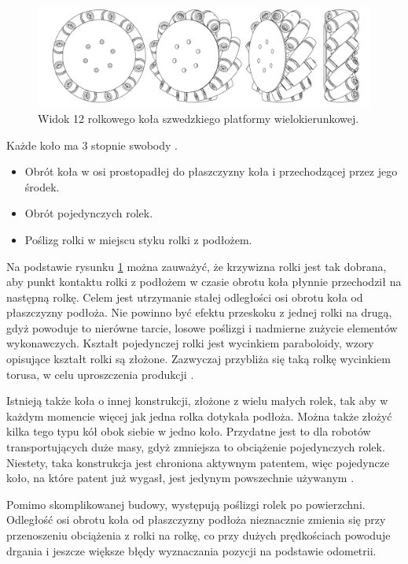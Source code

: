 	\begin{figure}[H]
	\centering
	\includegraphics[width=\textwidth]{graphics/wheel.pdf}
	\caption{Widok 12 rolkowego koła szwedzkiego platformy wielokierunkowej.}
	\label{fig:wheel}
	\end{figure} 

	Każde koło ma 3 stopnie swobody \cite{kinematic_modeling}.
	\begin{itemize}
		\item Obrót koła w osi prostopadłej do płaszczyzny koła i przechodzącej przez jego środek.
		\item Obrót pojedynczych rolek.
		\item Poślizg rolki w miejscu styku rolki z podłożem.
	\end{itemize}

	Na podstawie rysunku \ref{fig:wheel} można zauważyć, że krzywizna rolki jest tak dobrana, aby punkt kontaktu rolki z podłożem w czasie obrotu koła płynnie przechodził na następną rolkę.
	Celem jest utrzymanie stałej odległości osi obrotu koła od płaszczyzny podłoża.
	Nie powinno być efektu przeskoku z jednej rolki na drugą, gdyż powoduje to nierówne tarcie, losowe poślizgi i nadmierne zużycie elementów wykonawczych.
	Kształt pojedynczej rolki jest wycinkiem paraboloidy, wzory opisujące kształt rolki są złożone.
	Zazwyczaj przybliża się taką rolkę wycinkiem torusa, w celu uproszczenia produkcji \cite{rollers}.

	Istnieją także koła o innej konstrukcji, złożone z wielu małych rolek, tak aby w każdym momencie więcej jak jedna rolka dotykała podłoża.
	Można także złożyć kilka tego typu kół obok siebie w jedno koło.
	Przydatne jest to dla robotów transportujących duże masy, gdyż zmniejsza to obciążenie pojedynczych rolek.
	Niestety, taka konstrukcja jest chroniona aktywnym patentem, więc pojedyncze koło, na które patent już wygasł, jest jedynym powszechnie używanym \cite{paletobot}.

	Pomimo skomplikowanej budowy, występują poślizgi rolek po powierzchni.
	Odległość osi obrotu koła od płaszczyzny podłoża nieznacznie zmienia się przy przenoszeniu obciążenia z rolki na rolkę, co przy dużych prędkościach powoduje drgania i jeszcze większe błędy wyznaczania pozycji na podstawie odometrii.

